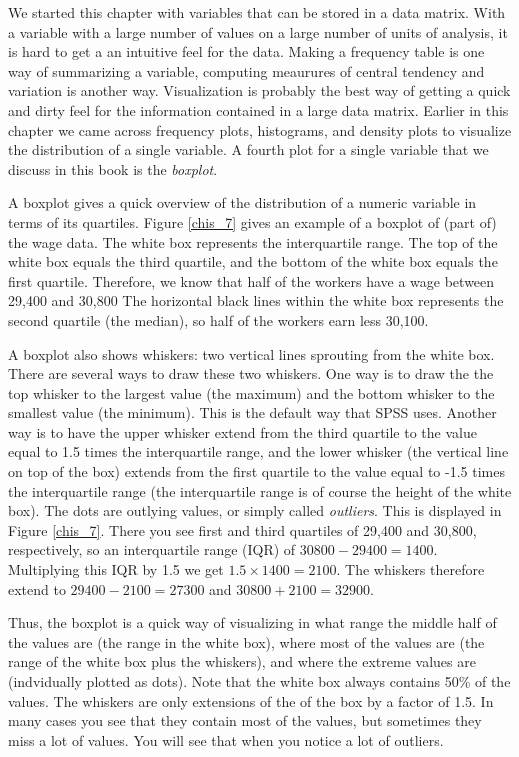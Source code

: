 \documentclass[]{book}\usepackage[]{graphicx}\usepackage[]{color}
\begin{document}
We started this chapter with variables that can be stored in a data matrix. With a variable with a large number of values on a large number of units of analysis, it is hard to get a an intuitive feel for the data. Making a frequency table is one way of summarizing a variable, computing meaurures of central tendency and variation is another way. Visualization is probably the best way of getting a quick and dirty feel for the information contained in a large data matrix. Earlier in this chapter we came across frequency plots, histograms, and density plots to visualize the distribution of a single variable. A fourth plot for a single variable that we discuss in this book is the \textit{boxplot}.  

A boxplot gives a quick overview of the distribution of a numeric variable in terms of its quartiles. Figure \ref {chis_7} gives an example of a boxplot of (part of) the wage data. The white box represents the interquartile range. The top of the white box equals the third quartile, and the bottom of the white box equals the first quartile. Therefore, we know that half of the workers have a wage between 29,400 and 30,800 The horizontal black lines within the white box represents the second quartile (the median), so half of the workers earn less 30,100. 

A boxplot also shows whiskers: two vertical lines sprouting from the white box. There are several ways to draw these two whiskers. One way is to draw the the top whisker to the largest value (the maximum) and the bottom whisker to the smallest value (the minimum). This is the default way that SPSS uses. Another way is to have the upper whisker extend from the third quartile to the value equal to 1.5 times the interquartile range, and the lower whisker (the vertical line on top of the box) extends from the first quartile to the value equal to -1.5 times the interquartile range (the interquartile range is of course the height of the white box). The dots are outlying values, or simply called \textit{outliers}. This is displayed in Figure \ref{chis_7}. There you see first and third quartiles of 29,400 and 30,800, respectively, so an interquartile range (IQR) of $30800-29400=1400$. Multiplying this IQR by 1.5 we get $1.5 \times 1400= 2100$. The whiskers therefore extend to $29400-2100=27300$ and $30800+2100=32900$. 

Thus, the boxplot is a quick way of visualizing in what range the middle half of the values are (the range in the white box), where most of the values are (the range of the white box plus the whiskers), and where the extreme values are (indvidually plotted as dots). Note that the white box always contains 50\% of the values. The whiskers are only extensions of the of the box by a factor of 1.5. In many cases you see that they contain most of the values, but sometimes they miss a lot of values. You will see that when you notice a lot of outliers.
\end{document}
